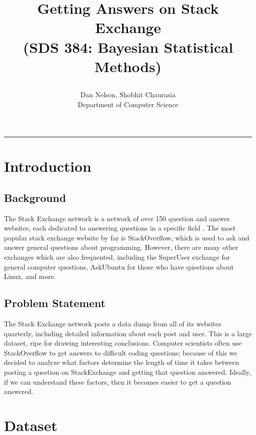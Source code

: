\documentclass[12pt]{article}
\begin{document}
 
 
\title{Getting Answers on Stack Exchange\\
\Large{(SDS 384: Bayesian Statistical Methods)}
\date{}%
} %
\author{Dan Nelson, Shobhit Chaurasia\\
Department of Computer Science}

\maketitle
\hrule

\section{Introduction}
\subsection{Background}
The Stack Exchange network is a network of over 150 question and answer websites, each dedicated to answering questions in a specific field \cite{StackExchange}. The most popular stack exchange website by far is StackOverflow, which is used to ask and answer general questions about programming. However, there are many other exchanges which are also frequented, including the SuperUser exchange for general computer questions, AskUbuntu for those who have questions about Linux, and more. 
 
\subsection{Problem Statement}

The Stack Exchange network posts a data dump from all of its websites quarterly, including detailed information about each post and user. This is a large dataset, ripe for drawing interesting conclusions. Computer scientists often use StackOverflow to get answers to difficult coding questions; because of this we decided to analyze what factors determine the length of time it takes between posting a question on StackExchange and getting that question answered. Ideally, if we can understand these factors, then it becomes easier to get a question answered.


\section{Dataset}
\end{document}
